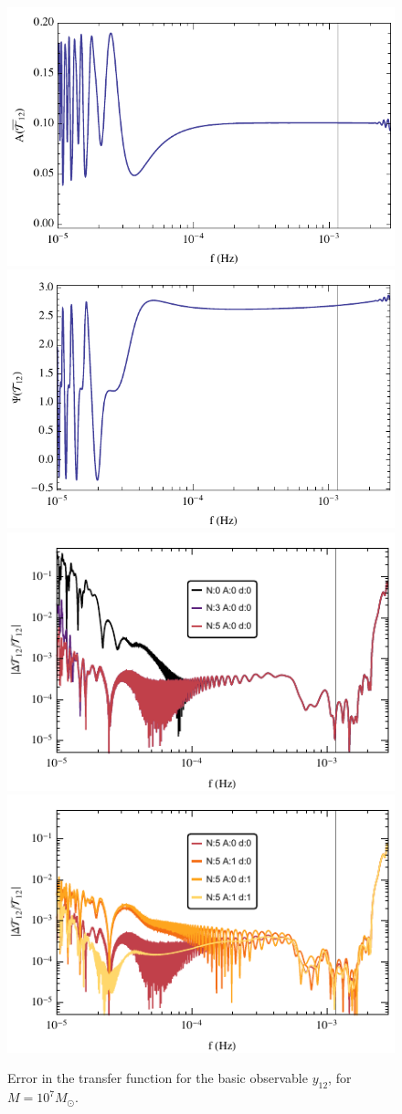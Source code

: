\documentclass[aps,showpacs,twocolumn,
prd,superscriptaddress,nofootinbib]{revtex4-1}
\newcommand{\Msol}{M_{\odot}}
\begin{document}
\begin{figure}
  \centering
  \includegraphics[width=.48\linewidth]{plots/LISAtransferM1e7y12Lamp.pdf}
  \hspace{0.2cm}
  \includegraphics[width=.48\linewidth]{plots/LISAtransferM1e7y12Lphase.pdf}
  \includegraphics[width=.48\linewidth]{plots/LISAerrorM1e7y12LcorrPsi.pdf}
  \hspace{0.2cm}
  \includegraphics[width=.48\linewidth]{plots/LISAerrorM1e7y12LcorrAd.pdf}
  \caption{Error in the transfer function for the basic observable $y_{12}$, for $M=10^{7} \Msol$.}
  \label{fig:prectoymodel}
\end{figure}
\end{document}
